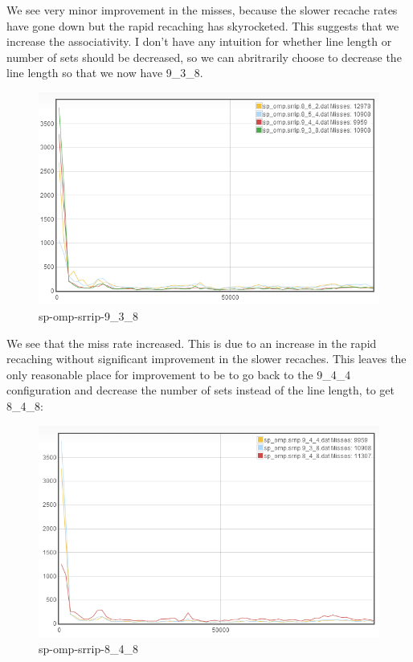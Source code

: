We see very minor improvement in the misses, because the slower recache rates have gone down but the rapid recaching has skyrocketed. This suggests that we increase the associativity. I don't have any intuition for whether line length or number of sets should be decreased, so we can abritrarily choose to decrease the line length so that we now have 9\_3\_8.

\begin{figure}
\begin{center}
\includegraphics[width={0.9\columnwidth}]{images/sp_omp-srrip-9_3_8}
\end{center}
\caption{sp-omp-srrip-9\_3\_8}
\label{9_3_8}
\end{figure}

We see that the miss rate increased. This is due to an increase in the rapid recaching without significant improvement in the slower recaches. This leaves the only reasonable place for improvement to be to go back to the 9\_4\_4 configuration and decrease the number of sets instead of the line length, to get 8\_4\_8:

\begin{figure}
\begin{center}
\includegraphics[width={0.9\columnwidth}]{images/sp_omp-srrip-8_4_8}
\end{center}
\caption{sp-omp-srrip-8\_4\_8}
\label{8_4_8}
\end{figure}

